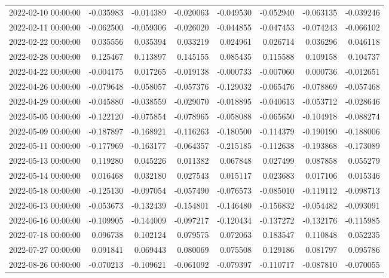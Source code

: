 \begin{tabular}{lrrrrrrr}
2022-02-10 00:00:00 & -0.035983 & -0.014389 & -0.020063 & -0.049530 & -0.052940 & -0.063135 & -0.039246 \\
2022-02-11 00:00:00 & -0.062500 & -0.059306 & -0.026020 & -0.044855 & -0.047453 & -0.074243 & -0.066102 \\
2022-02-22 00:00:00 & 0.035556 & 0.035394 & 0.033219 & 0.024961 & 0.026714 & 0.036296 & 0.046118 \\
2022-02-28 00:00:00 & 0.125467 & 0.113897 & 0.145155 & 0.085435 & 0.115588 & 0.109158 & 0.104737 \\
2022-04-22 00:00:00 & -0.004175 & 0.017265 & -0.019138 & -0.000733 & -0.007060 & 0.000736 & -0.012651 \\
2022-04-26 00:00:00 & -0.079648 & -0.058057 & -0.057376 & -0.129032 & -0.065476 & -0.078869 & -0.057468 \\
2022-04-29 00:00:00 & -0.045880 & -0.038559 & -0.029070 & -0.018895 & -0.040613 & -0.053712 & -0.028646 \\
2022-05-05 00:00:00 & -0.122120 & -0.075854 & -0.078965 & -0.058088 & -0.065650 & -0.104918 & -0.088274 \\
2022-05-09 00:00:00 & -0.187897 & -0.168921 & -0.116263 & -0.180500 & -0.114379 & -0.190190 & -0.188006 \\
2022-05-11 00:00:00 & -0.177969 & -0.163177 & -0.064357 & -0.215185 & -0.112638 & -0.193868 & -0.173089 \\
2022-05-13 00:00:00 & 0.119280 & 0.045226 & 0.011382 & 0.067848 & 0.027499 & 0.087858 & 0.055279 \\
2022-05-14 00:00:00 & 0.016468 & 0.032180 & 0.027543 & 0.015117 & 0.023683 & 0.017106 & 0.015346 \\
2022-05-18 00:00:00 & -0.125130 & -0.097054 & -0.057490 & -0.076573 & -0.085010 & -0.119112 & -0.098713 \\
2022-06-13 00:00:00 & -0.053673 & -0.132439 & -0.154801 & -0.146480 & -0.156832 & -0.054482 & -0.093091 \\
2022-06-16 00:00:00 & -0.109905 & -0.144009 & -0.097217 & -0.120434 & -0.137272 & -0.132176 & -0.115985 \\
2022-07-18 00:00:00 & 0.096738 & 0.102124 & 0.079575 & 0.072063 & 0.183547 & 0.110848 & 0.052235 \\
2022-07-27 00:00:00 & 0.091841 & 0.069443 & 0.080069 & 0.075508 & 0.129186 & 0.081797 & 0.095786 \\
2022-08-26 00:00:00 & -0.070213 & -0.109621 & -0.061092 & -0.079397 & -0.110717 & -0.087810 & -0.070055 \\

\end{tabular}
